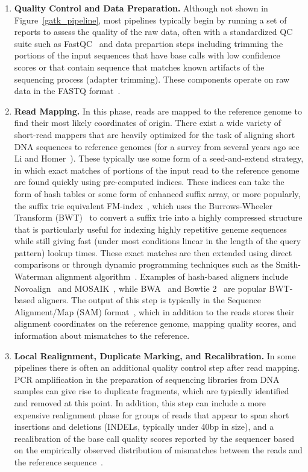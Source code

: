 \begin{enumerate}
\item \textbf{Quality Control and Data Preparation.} Although not shown in Figure~\ref{gatk_pipeline}, most pipelines typically begin by running a set of reports to assess the quality of the raw data, often with a standardized QC suite such as FastQC~\cite{fastqc} and data prepartion steps including trimming the portions of the input sequences that have base calls with low confidence scores or that contain sequence that matches known artifacts of the sequencing process (adapter trimming). These components operate on raw data in the FASTQ format~\cite{Cock:2010ky}.

\item \textbf{Read Mapping.} In this phase, reads are mapped to the reference genome to find their most likely coordinates of origin. There exist a wide variety of short-read mappers that are heavily optimized for the task of aligning short DNA sequences to reference genomes (for a survey from several years ago see Li and Homer~\cite{Li:2010p10}). These typically use some form of a seed-and-extend strategy, in which exact matches of portions of the input read to the reference genome are found quickly using pre-computed indices. These indices can take the form of hash tables or some form of enhanced suffix array, or more popularly, the suffix trie equivalent FM-index~\cite{Ferragina:2000vl}, which uses the Burrows-Wheeler Transform (BWT)~\cite{Lossless94ablock-sorting} to convert a suffix trie into a highly compressed structure that is particularly useful for indexing highly repetitive geneme sequences while still giving fast (under most conditions linear in the length of the query pattern) lookup times. These exact matches are then extended using direct comparisons or through dynamic programming techniques such as the Smith-Waterman alignment algorithm~\cite{Smith:1981up}. Examples of hash-based aligners include Novoalign~\cite{novoalign} and MOSAIK~\cite{2013arXiv1309.1149L}, while BWA~\cite{Li:2009p836} and Bowtie 2~\cite{Langmead:2012jh} are popular BWT-based aligners. The output of this step is typically in the Sequence Alignment/Map (SAM) format~\cite{Li:2009vz}, which in addition to the reads stores their alignment coordinates on the reference genome, mapping quality scores, and information about mismatches to the reference.

\item \textbf{Local Realignment, Duplicate Marking, and Recalibration.} In some pipelines there is often an additional quality control step after read mapping. PCR amplification in the preparation of sequencing libraries from DNA samples can give rise to duplicate fragments, which are typically identified and removed at this point. In addition, this step can include a more expensive realignment phase for groups of reads that appear to span short insertions and deletions (INDELs, typically under 40bp in size), and a recalibration of the base call quality scores reported by the sequencer based on the empirically observed distribution of mismatches between the reads and the reference sequence~\cite{DePristo:2011fo}.


\end{enumerate}
